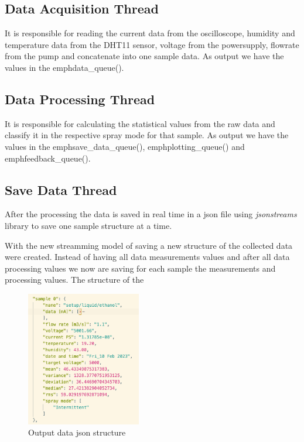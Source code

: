     \subsection{Data Acquisition Thread}

        It is responsible for reading the current data from the oscilloscope, humidity and temperature data from the DHT11 sensor, voltage from the powersupply, flowrate from the pump and concatenate into one sample data.
        As output we have the values in the emph{data\_queue()}.

    \subsection{Data Processing Thread}

        It is responsible for calculating the statistical values from the raw data and classify it in the respective spray mode for that sample.
        As output we have the values in the emph{save\_data\_queue()}, emph{plotting\_queue()} and emph{feedback\_queue()}.
    
        \subsection{Save Data Thread}

        After the processing the data is saved in real time in a json file using \emph{jsonstreams} library to save one sample structure at a time.

        With the new streamming model of saving a new structure of the collected data were created.
        Instead of having all data measurements values and after all data processing values we now are saving for each sample the measurements and processing values.
        The structure of the 
    
        \begin{figure}[H]
            \center
            \includegraphics[width=5cm]{Figuras/report4/json_structure.png}
            \caption{Output data json structure}
        \end{figure}
    

